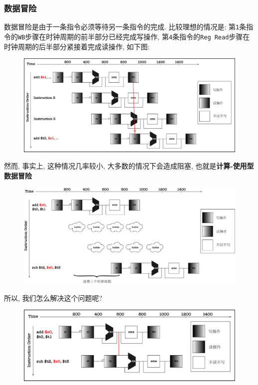 \subsubsection{数据冒险}
数据冒险是由于一条指令必须等待另一条指令的完成. 比较理想的情况是: 第\verb|1|条指令的\verb|WB|步骤在时钟周期的前半部分已经完成写操作, 第\verb|4|条指令的\verb|Reg Read|步骤在时钟周期的后半部分紧接着完成读操作, 如下图:
\begin{figure}[H]
\centering
\includegraphics[scale=.4]{img/figure41.pdf}
\end{figure}
然而, 事实上, 这种情况几率较小, 大多数的情况下会造成阻塞, 也就是{\heiti \textbf{计算-使用型数据冒险}}
\begin{figure}[H]
\centering
\includegraphics[scale=.4]{img/figure42.pdf}
\end{figure}
所以, 我们怎么解决这个问题呢?
\begin{figure}[H]
\centering
\includegraphics[scale=.4]{img/figure43.pdf}
\end{figure}
